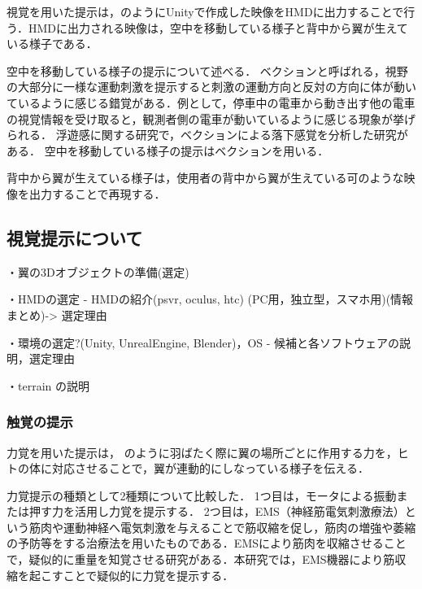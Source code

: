         視覚を用いた提示は，のようにUnityで作成した映像をHMDに出力することで行う．HMDに出力される映像は，空中を移動している様子と背中から翼が生えている様子である．

        空中を移動している様子の提示について述べる．
        ベクションと呼ばれる，視野の大部分に一様な運動刺激を提示すると刺激の運動方向と反対の方向に体が動いているように感じる錯覚がある\cite{妹尾武治2014ベクションとその周辺の近年の動向}．例として，停車中の電車から動き出す他の電車の視覚情報を受け取ると，観測者側の電車が動いているように感じる現象が挙げられる．
        浮遊感に関する研究で，ベクションによる落下感覚を分析した研究がある\cite{奥川夏輝2017VR空間における視覚刺激によって発生する落下感覚の分析}．
        空中を移動している様子の提示はベクションを用いる．

        背中から翼が生えている様子は，使用者の背中から翼が生えている可のような映像を出力することで再現する．  

        \subsection{視覚提示について}
        ・翼の3Dオブジェクトの準備(選定)

        ・HMDの選定
            - HMDの紹介(psvr, oculus, htc) (PC用，独立型，スマホ用)(情報まとめ)-> 選定理由

        ・環境の選定?(Unity, UnrealEngine, Blender)，OS
            - 候補と各ソフトウェアの説明，選定理由

        ・terrain の説明

    
    \subsubsection{触覚の提示}

        力覚を用いた提示は，
        のように羽ばたく際に翼の場所ごとに作用する力を，ヒトの体に対応させることで，翼が連動的にしなっている様子を伝える．

        力覚提示の種類として2種類について比較した．
        1つ目は，モータによる振動または押す力を活用し力覚を提示する．
        2つ目は，EMS（神経筋電気刺激療法）という筋肉や運動神経へ電気刺激を与えることで筋収縮を促し，筋肉の増強や萎縮の予防等をする治療法を用いたものである．EMSにより筋肉を収縮させることで，疑似的に重量を知覚させる研究がある\cite{小川剛史2017電気的筋肉刺激が重量知覚に及ぼす影響の分析}．本研究では，EMS機器により筋収縮を起こすことで疑似的に力覚を提示する．

